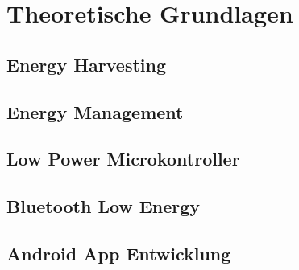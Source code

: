 \chapter{Theoretische Grundlagen}

\section{Energy Harvesting}

\section{Energy Management}

\section{Low Power Microkontroller }

\section{Bluetooth Low Energy}

\section{Android App Entwicklung}



